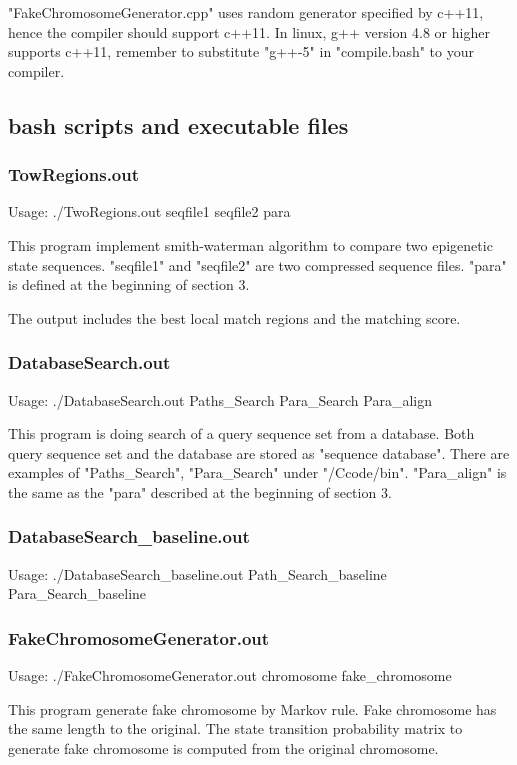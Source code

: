 \documentclass[a4paper]{article}
\begin{document}
\begin{CJK*}{UTF8}{kai}
"FakeChromosomeGenerator.cpp" uses random generator specified by c++11, hence the compiler should support c++11. In linux, g++ version 4.8 or higher supports c++11, remember to substitute "g++-5" in "compile.bash" to your compiler.

\subsection{bash scripts and executable files}
\subsubsection{TowRegions.out}

Usage: ./TwoRegions.out seqfile1 seqfile2 para

This program implement smith-waterman algorithm to compare two epigenetic state sequences. "seqfile1" and "seqfile2" are two compressed sequence files. "para" is defined at the beginning of section 3.

The output includes the best local match regions and the matching score.

\subsubsection{DatabaseSearch.out}
Usage: ./DatabaseSearch.out Paths\_Search Para\_Search Para\_align

This program is doing search of a query sequence set from a database. Both query sequence set and the database are stored as "sequence database". There are examples of "Paths\_Search", "Para\_Search" under "/Ccode/bin". "Para\_align" is the same as the "para" described at the beginning of section 3.

\subsubsection{DatabaseSearch\_baseline.out}

Usage: ./DatabaseSearch\_baseline.out Path\_Search\_baseline Para\_Search\_baseline


\subsubsection{FakeChromosomeGenerator.out}

Usage: ./FakeChromosomeGenerator.out chromosome fake\_chromosome

This program generate fake chromosome by Markov rule. Fake chromosome has the same length to the original. The state transition probability matrix to generate fake chromosome is computed from the original chromosome.


\end{CJK*}
\end{document}
